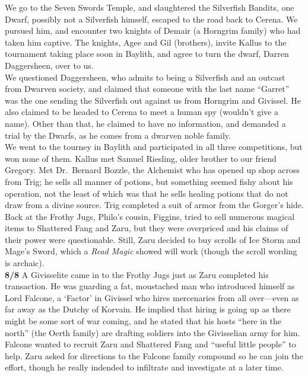 \documentclass[letterpaper]{article}
\begin{document}
\noindent We go to the Seven Swords Temple, and slaughtered the Silverfish Bandits, one Dwarf, possibly not a Silverfish himself, escaped to the road back to Cerena. We pursued him, and encounter two knights of Demair (a Horngrim family) who had taken him captive. The knights, Agee and Gil (brothers), invite Kallus to the tournament taking place soon in Baylith, and agree to turn the dwarf, Darren Daggersheen, over to us.\\

\noindent We questioned Daggersheen, who admits to being a Silverfish and an outcast from Dwarven society, and claimed that someone with the last name ``Garret'' was the one sending the Silverfish out against us from Horngrim and Givissel. He also claimed to be headed to Cerena to meet a human spy (wouldn't give a name).  Other than that, he claimed to have no information, and demanded a trial by the Dwarfs, as he comes from a dwarven noble family.\\

\noindent We went to the tourney in Baylith and participated in all three competitions, but won none of them. Kallus met Samuel Riesling, older brother to our friend Gregory.  Met Dr.\ Bernard Bozzle, the Alchemist who has opened up shop across from Trig; he sells all manner of potions, but something seemed fishy about his operation, not the least of which was that he sells healing potions that do not draw from a divine source.  Trig completed a suit of armor from the Gorger's hide. Back at the Frothy Jugs, Philo's cousin, Figgins, tried to sell numerous magical items to Shattered Fang and Zaru, but they were overpriced and his claims of their power were questionable. Still, Zaru decided to buy scrolls of Ice Storm and Mage's Sword, which a \emph{Read Magic} showed will work (though the scroll wording is archaic).\\

\noindent \textbf{8/8} A Givisselite came in to the Frothy Jugs just as Zaru completed his transaction.  He was guarding a fat, moustached man who introduced himself as Lord Falcone, a `Factor' in Givissel who hires mercenaries from all over---even as far away as the Dutchy of Korvain.  He implied that hiring is going up as there might be some sort of war coming, and he stated that his hosts ``here in the north'' (the Oerth family) are drafting soldiers into the Givisselian army for him.  Falcone wanted to recruit Zaru and Shattered Fang and ``useful little people'' to help. Zaru asked for directions to the Falcone family compound so he can join the effort, though he really indended to infiltrate and investigate at a later time.\\
\end{document}
